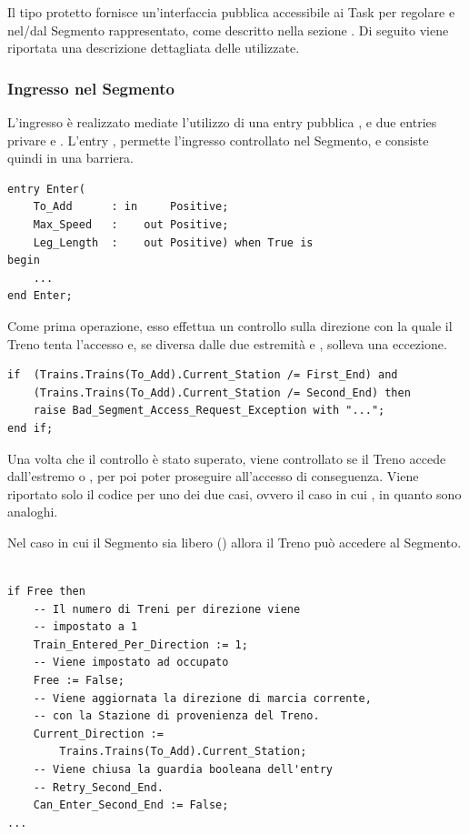 	Il tipo protetto  fornisce un'interfaccia pubblica accessibile ai Task  per regolare  e  nel/dal Segmento rappresentato, come descritto nella sezione \label{subsubsec:segment_access}. Di seguito viene riportata una descrizione dettagliata delle  utilizzate.
	
	\subsubsection{Ingresso nel Segmento}
	
	L'ingresso è realizzato mediate l'utilizzo di una entry pubblica , e due entries privare  e .	
	L'entry , permette l'ingresso controllato nel Segmento, e consiste quindi in una barriera.

\begin{lstlisting}
entry Enter(
	To_Add      : in     Positive;
	Max_Speed   : 	 out Positive;
	Leg_Length  :    out Positive) when True is
begin
	...
end Enter;
\end{lstlisting}

	Come prima operazione, esso effettua un controllo sulla direzione con la quale il Treno tenta l'accesso e, se diversa dalle due estremità  e , solleva una eccezione.

\begin{lstlisting}
if  (Trains.Trains(To_Add).Current_Station /= First_End) and 
    (Trains.Trains(To_Add).Current_Station /= Second_End) then
	raise Bad_Segment_Access_Request_Exception with "...";
end if;
\end{lstlisting}

Una volta che il controllo è stato superato, viene controllato se il Treno accede dall'estremo  o , per poi poter proseguire all'accesso di conseguenza. Viene riportato solo il codice per uno dei due casi, ovvero il caso in cui , in quanto sono analoghi.

Nel caso in cui il Segmento sia libero () allora il Treno può accedere al Segmento.

\begin{lstlisting}

if Free then
	-- Il numero di Treni per direzione viene 
	-- impostato a 1
	Train_Entered_Per_Direction := 1;
	-- Viene impostato ad occupato
	Free := False;
	-- Viene aggiornata la direzione di marcia corrente,
	-- con la Stazione di provenienza del Treno.
	Current_Direction := 
		Trains.Trains(To_Add).Current_Station;
	-- Viene chiusa la guardia booleana dell'entry 
	-- Retry_Second_End. 
	Can_Enter_Second_End := False;
...

\end{lstlisting}

